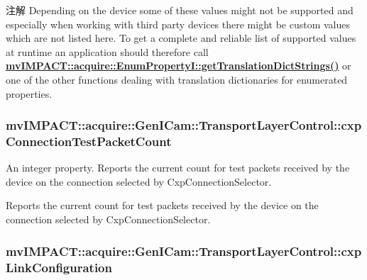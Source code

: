 \begin{DoxyNote}{注解}
Depending on the device some of these values might not be supported and especially when working with third party devices there might be custom values which are not listed here. To get a complete and reliable list of supported values at runtime an application should therefore call {\bfseries \hyperlink{classmv_i_m_p_a_c_t_1_1acquire_1_1_enum_property_i_a0ba6ccbf5ee69784d5d0b537924d26b6}{mv\+I\+M\+P\+A\+C\+T\+::acquire\+::\+Enum\+Property\+I\+::get\+Translation\+Dict\+Strings()}} or one of the other functions dealing with translation dictionaries for enumerated properties. 
\end{DoxyNote}
\hypertarget{classmv_i_m_p_a_c_t_1_1acquire_1_1_gen_i_cam_1_1_transport_layer_control_a24bdadbf9fa1a55252a8c1d56f541000}{
\subsubsection[{cxp\+Connection\+Test\+Packet\+Count}]{ mv\+I\+M\+P\+A\+C\+T\+::acquire\+::\+Gen\+I\+Cam\+::\+Transport\+Layer\+Control\+::cxp\+Connection\+Test\+Packet\+Count}}\label{classmv_i_m_p_a_c_t_1_1acquire_1_1_gen_i_cam_1_1_transport_layer_control_a24bdadbf9fa1a55252a8c1d56f541000}


An integer property. Reports the current count for test packets received by the device on the connection selected by Cxp\+Connection\+Selector. 

Reports the current count for test packets received by the device on the connection selected by Cxp\+Connection\+Selector. \hypertarget{classmv_i_m_p_a_c_t_1_1acquire_1_1_gen_i_cam_1_1_transport_layer_control_a683e00892c6c6b661be972fa266b09f9}{
\subsubsection[{cxp\+Link\+Configuration}]{ mv\+I\+M\+P\+A\+C\+T\+::acquire\+::\+Gen\+I\+Cam\+::\+Transport\+Layer\+Control\+::cxp\+Link\+Configuration}}\label{classmv_i_m_p_a_c_t_1_1acquire_1_1_gen_i_cam_1_1_transport_layer_control_a683e00892c6c6b661be972fa266b09f9}


